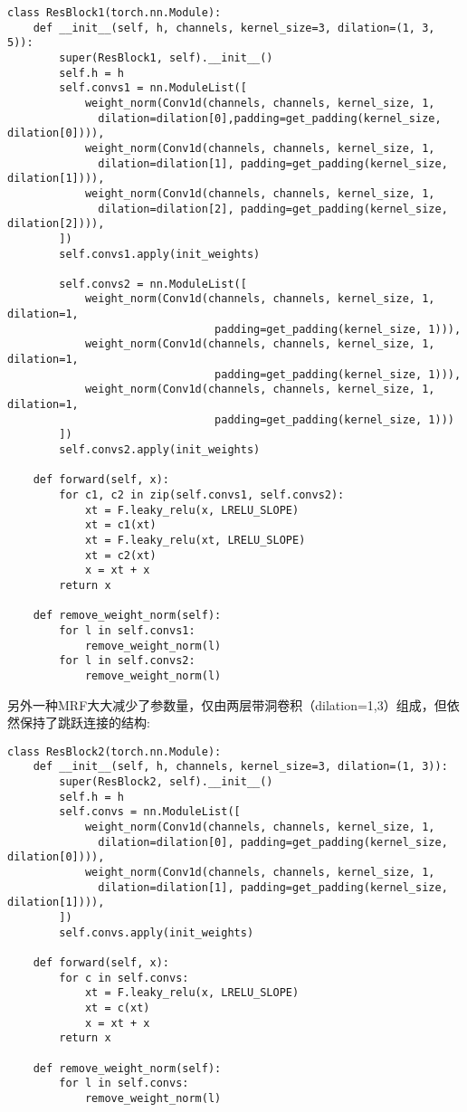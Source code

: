 \documentclass[cn,10pt,math=newtx,citestyle=gb7714-2015,bibstyle=gb7714-2015]{elegantbook}
\begin{document}
\begin{lstlisting}
class ResBlock1(torch.nn.Module):
    def __init__(self, h, channels, kernel_size=3, dilation=(1, 3, 5)):
        super(ResBlock1, self).__init__()
        self.h = h
        self.convs1 = nn.ModuleList([
            weight_norm(Conv1d(channels, channels, kernel_size, 1, 
              dilation=dilation[0],padding=get_padding(kernel_size, dilation[0]))),
            weight_norm(Conv1d(channels, channels, kernel_size, 1, 
              dilation=dilation[1], padding=get_padding(kernel_size, dilation[1]))),
            weight_norm(Conv1d(channels, channels, kernel_size, 1, 
              dilation=dilation[2], padding=get_padding(kernel_size, dilation[2]))),
        ])
        self.convs1.apply(init_weights)

        self.convs2 = nn.ModuleList([
            weight_norm(Conv1d(channels, channels, kernel_size, 1, dilation=1,
                                padding=get_padding(kernel_size, 1))),
            weight_norm(Conv1d(channels, channels, kernel_size, 1, dilation=1,
                                padding=get_padding(kernel_size, 1))),
            weight_norm(Conv1d(channels, channels, kernel_size, 1, dilation=1,
                                padding=get_padding(kernel_size, 1)))
        ])
        self.convs2.apply(init_weights)

    def forward(self, x):
        for c1, c2 in zip(self.convs1, self.convs2):
            xt = F.leaky_relu(x, LRELU_SLOPE)
            xt = c1(xt)
            xt = F.leaky_relu(xt, LRELU_SLOPE)
            xt = c2(xt)
            x = xt + x
        return x

    def remove_weight_norm(self):
        for l in self.convs1:
            remove_weight_norm(l)
        for l in self.convs2:
            remove_weight_norm(l)
\end{lstlisting}

另外一种MRF大大减少了参数量，仅由两层带洞卷积（dilation=1,3）组成，但依然保持了跳跃连接的结构:

\begin{lstlisting}
class ResBlock2(torch.nn.Module):
    def __init__(self, h, channels, kernel_size=3, dilation=(1, 3)):
        super(ResBlock2, self).__init__()
        self.h = h
        self.convs = nn.ModuleList([
            weight_norm(Conv1d(channels, channels, kernel_size, 1, 
              dilation=dilation[0], padding=get_padding(kernel_size, dilation[0]))),
            weight_norm(Conv1d(channels, channels, kernel_size, 1, 
              dilation=dilation[1], padding=get_padding(kernel_size, dilation[1]))),
        ])
        self.convs.apply(init_weights)

    def forward(self, x):
        for c in self.convs:
            xt = F.leaky_relu(x, LRELU_SLOPE)
            xt = c(xt)
            x = xt + x
        return x

    def remove_weight_norm(self):
        for l in self.convs:
            remove_weight_norm(l)
\end{lstlisting}
\end{document}
